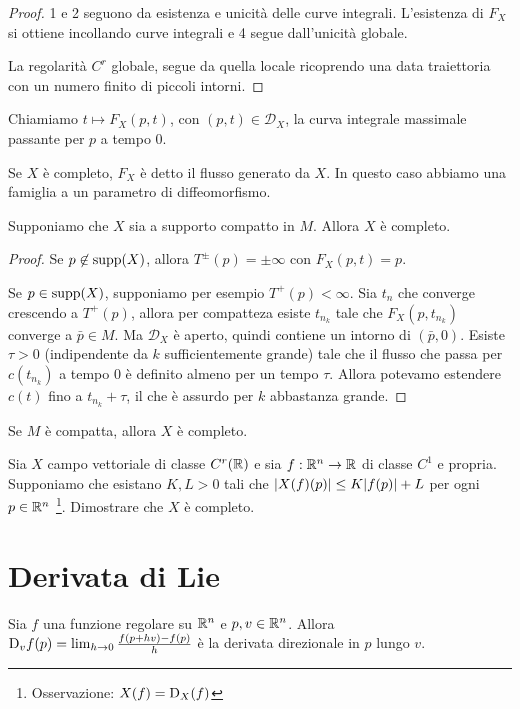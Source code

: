 \begin{proof}
	1 e 2 seguono da esistenza e unicità delle curve integrali. L'esistenza di $F_X$ si ottiene incollando curve integrali e 4 segue dall'unicità globale.
	
	La regolarità $C^r$ globale, segue da quella locale ricoprendo una data traiettoria con un numero finito di piccoli intorni.
\end{proof}

\begin{definition}
	Chiamiamo $t\mapsto F_X(p,t)$, con $(p,t)\in\mathcal D_X$, la curva integrale massimale passante per $p$ a tempo 0.
	
	Se $X$ è completo, $F_X$ è detto il flusso generato da $X$. In questo caso abbiamo una famiglia a un parametro di diffeomorfismo.
\end{definition}

\begin{proposition}
	Supponiamo che $X$ sia a supporto compatto in $M$. Allora $X$ è completo.
\end{proposition}

\begin{proof}
	Se $p\not \in\operatorname{supp} (X)$, allora $T^{\pm}(p)=\pm\infty$ con $F_X(p,t)=p$.
	
	Se $p\in\operatorname{supp}(X)$, supponiamo per esempio $T^+(p)<\infty$. Sia $t_n$ che converge crescendo a $T^+(p)$, allora per compatteza esiste $t_{n_k}$ tale che $F_X(p,t_{n_k})$ converge a $\bar p\in M$.
	Ma $\mathcal D_X$ è aperto, quindi contiene un intorno di $(\bar p,0)$.
	Esiste $\tau >0$ (indipendente da $k$ sufficientemente grande) tale che il flusso che passa per $c(t_{n_k})$ a tempo 0 è definito almeno per un tempo $\tau$.
	Allora potevamo estendere $c(t)$ fino a $t_{n_k}+\tau$, il che è assurdo per $k$ abbastanza grande.
\end{proof}


\begin{corollary}
	Se $M$ è compatta, allora $X$ è completo.
\end{corollary}


\begin{exercise}
	Sia $X$ campo vettoriale di classe $C^r(\mathbb R)$ e sia $f:\mathbb R^n\to \mathbb R$ di classe $C^1$ e propria. Supponiamo che esistano $K,L>0$ tali che $\lvert X(f)(p)\rvert\le K\lvert f(p)\rvert+L$ per ogni $p\in\mathbb R^n$ \footnote{Osservazione: $X(f)=\mathrm D_X(f)$}. Dimostrare che $X$ è completo.
\end{exercise}


\section{Derivata di Lie}
Sia $f$ una funzione regolare su $\mathbb R^n$ e $p,v\in\mathbb R^n$. Allora $\mathrm D_vf(p)=\lim_{h\to 0} \frac{f(p+hv)-f(p)}h$ è la derivata direzionale in $p$ lungo $v$.

